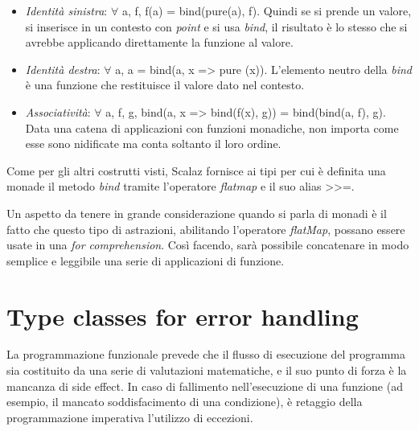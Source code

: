\begin{itemize}
\item \textit{Identità sinistra}: $\forall$ a, f, f(a) = bind(pure(a), f). Quindi se si prende un valore, si inserisce in un contesto con \textit{point} e si usa \textit{bind}, il risultato è lo stesso che si avrebbe applicando direttamente la funzione al valore.
\item \textit{Identità destra}: $\forall$ a, a = bind(a, x => pure (x)). L'elemento neutro della \textit{bind} è una funzione che restituisce il valore dato nel contesto.
\item \textit{Associatività}: $\forall$ a, f, g, bind(a, x => bind(f(x), g)) = bind(bind(a, f), g). Data una catena di applicazioni con funzioni monadiche, non importa come esse sono nidificate ma conta soltanto il loro ordine.
\end{itemize}

Come per gli altri costrutti visti, Scalaz fornisce ai tipi per cui è definita una monade il metodo \textit{bind} tramite l'operatore \textit{flatmap} e il suo alias >>=.



Un aspetto da tenere in grande considerazione quando si parla di monadi è il fatto che questo tipo di astrazioni, abilitando l'operatore \textit{flatMap}, possano essere usate in una \textit{for comprehension}. Così facendo, sarà possibile concatenare in modo semplice e leggibile una serie di applicazioni di funzione.




\section{Type classes for error handling}

La programmazione funzionale prevede che il flusso di esecuzione del programma sia costituito da una serie di valutazioni matematiche, e il suo punto di forza è la mancanza di side effect. In caso di fallimento nell'esecuzione di una funzione (ad esempio, il mancato soddisfacimento di una condizione), è retaggio della programmazione imperativa l'utilizzo di eccezioni.

